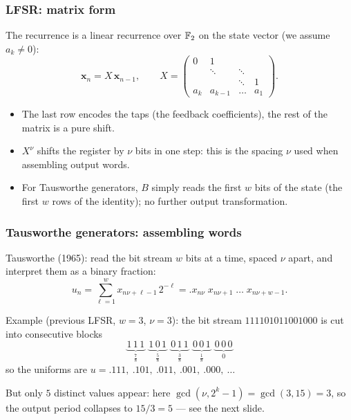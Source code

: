 \documentclass[aspectratio=169]{beamer}
\def\blue{\color{blue}}
\def\red{\color{red}}
\begin{document}
	\begin{frame}
		\frametitle{LFSR: matrix form}
		
		The recurrence is a linear recurrence over ${\mathbb{F}}_2$ on the state vector
		(we assume $a_k \ne 0$):
		\[
			\boldsymbol{x}_n = X\, \boldsymbol{x}_{n-1},
			\qquad
			X =
			\begin{pmatrix}
				0    & 1      &        &        \\
				     & \ddots & \ddots &        \\
				     &        & \ddots & 1      \\
				a_k  & a_{k-1} & \ldots & a_1
			\end{pmatrix}.
		\]
		
		\begin{itemize}
			\item
			The {\blue last row} encodes the taps (the feedback coefficients), the rest of
			the matrix is a pure shift.
			\item
			$X^\nu$ shifts the register by $\nu$ bits in one step: this is the spacing
			$\nu$ used when assembling output words.
			\item
			For {\blue Tausworthe} generators, $B$ simply reads the first $w$ bits of the
			state (the first $w$ rows of the identity); no further output transformation.
		\end{itemize}
		
	\end{frame}
	
	\begin{frame}
		\frametitle{Tausworthe generators: assembling words}
		
		{\blue Tausworthe (1965):} read the bit stream $w$ bits at a time, spaced
		$\nu$ apart, and interpret them as a binary fraction:
		\[
			u_n = \sum_{\ell=1}^{w} x_{n\nu + \ell - 1}\, 2^{-\ell}
			    = .x_{n\nu}\; x_{n\nu+1}\; \ldots\; x_{n\nu+w-1}.
		\]
		
		\vfill
		
		{\blue Example} (previous LFSR, $w = 3$, $\nu = 3$): the bit stream
		$111101011001000$ is cut into consecutive blocks
		\[
			\underbrace{1\,1\,1}_{\tfrac78}\ \ \underbrace{1\,0\,1}_{\tfrac58}\ \ \underbrace{0\,1\,1}_{\tfrac38}\ \ \underbrace{0\,0\,1}_{\tfrac18}\ \ \underbrace{0\,0\,0}_{0}
		\]
		so the uniforms are $u = .111,\ .101,\ .011,\ .001,\ .000,\ \ldots$

		{\red But} only $5$ distinct values appear: here $\gcd(\nu, 2^k-1) = \gcd(3,15) = 3$,
		so the output period collapses to $15/3 = 5$ --- see the next slide.
		
	\end{frame}
	
\end{document}
